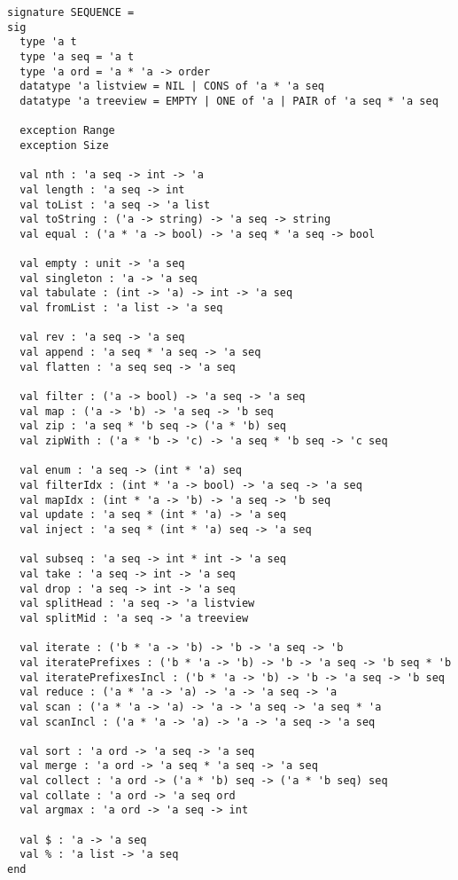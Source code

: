 \begin{cluster}
\label{grp:grm:seq-interface::signature}

\begin{gram}
\label{grm:seq-interface::signature}
\begin{verbatim}
signature SEQUENCE =
sig
  type 'a t
  type 'a seq = 'a t
  type 'a ord = 'a * 'a -> order
  datatype 'a listview = NIL | CONS of 'a * 'a seq
  datatype 'a treeview = EMPTY | ONE of 'a | PAIR of 'a seq * 'a seq

  exception Range
  exception Size

  val nth : 'a seq -> int -> 'a
  val length : 'a seq -> int
  val toList : 'a seq -> 'a list
  val toString : ('a -> string) -> 'a seq -> string
  val equal : ('a * 'a -> bool) -> 'a seq * 'a seq -> bool

  val empty : unit -> 'a seq
  val singleton : 'a -> 'a seq
  val tabulate : (int -> 'a) -> int -> 'a seq
  val fromList : 'a list -> 'a seq

  val rev : 'a seq -> 'a seq
  val append : 'a seq * 'a seq -> 'a seq
  val flatten : 'a seq seq -> 'a seq

  val filter : ('a -> bool) -> 'a seq -> 'a seq
  val map : ('a -> 'b) -> 'a seq -> 'b seq
  val zip : 'a seq * 'b seq -> ('a * 'b) seq
  val zipWith : ('a * 'b -> 'c) -> 'a seq * 'b seq -> 'c seq

  val enum : 'a seq -> (int * 'a) seq
  val filterIdx : (int * 'a -> bool) -> 'a seq -> 'a seq
  val mapIdx : (int * 'a -> 'b) -> 'a seq -> 'b seq
  val update : 'a seq * (int * 'a) -> 'a seq
  val inject : 'a seq * (int * 'a) seq -> 'a seq

  val subseq : 'a seq -> int * int -> 'a seq
  val take : 'a seq -> int -> 'a seq
  val drop : 'a seq -> int -> 'a seq
  val splitHead : 'a seq -> 'a listview
  val splitMid : 'a seq -> 'a treeview

  val iterate : ('b * 'a -> 'b) -> 'b -> 'a seq -> 'b
  val iteratePrefixes : ('b * 'a -> 'b) -> 'b -> 'a seq -> 'b seq * 'b
  val iteratePrefixesIncl : ('b * 'a -> 'b) -> 'b -> 'a seq -> 'b seq
  val reduce : ('a * 'a -> 'a) -> 'a -> 'a seq -> 'a
  val scan : ('a * 'a -> 'a) -> 'a -> 'a seq -> 'a seq * 'a
  val scanIncl : ('a * 'a -> 'a) -> 'a -> 'a seq -> 'a seq

  val sort : 'a ord -> 'a seq -> 'a seq
  val merge : 'a ord -> 'a seq * 'a seq -> 'a seq
  val collect : 'a ord -> ('a * 'b) seq -> ('a * 'b seq) seq
  val collate : 'a ord -> 'a seq ord
  val argmax : 'a ord -> 'a seq -> int

  val $ : 'a -> 'a seq
  val % : 'a list -> 'a seq
end
\end{verbatim}

\end{gram}
\end{cluster}


